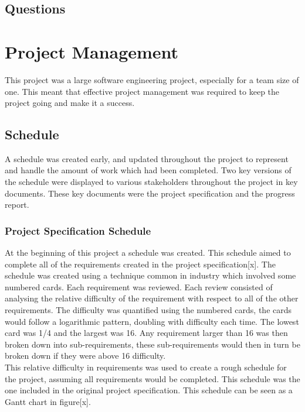 \documentclass{article}
\begin{document}
\subsection{Questions}



\section{Project Management}

This project was a large software engineering project, especially for a team size of one. This meant that effective project management was required to keep the project going and make it a success. 

\subsection{Schedule}

A schedule was created early, and updated throughout the project to represent and handle the amount of work which had been completed. Two key versions of the schedule were displayed to various stakeholders throughout the project in key documents. These key documents were the project specification and the progress report. 

\subsubsection{Project Specification Schedule}

At the beginning of this project a schedule was created. This schedule aimed to complete all of the requirements created in the project specification[x]. The schedule was created using a technique common in industry which involved some numbered cards. Each requirement was reviewed. Each review consisted of analysing the relative difficulty of the requirement with respect to all of the other requirements. The difficulty was quantified using the numbered cards, the cards would follow a logarithmic pattern, doubling with difficulty each time. The lowest card was 1/4 and the largest was 16. Any requirement larger than 16 was then broken down into sub-requirements, these sub-requirements would then in turn be broken down if they were above 16 difficulty. \\

This relative difficulty in requirements was used to create a rough schedule for the project, assuming all requirements would be completed. This schedule was the one included in the original project specification. This schedule can be seen as a Gantt chart in figure[x].
\end{document}
